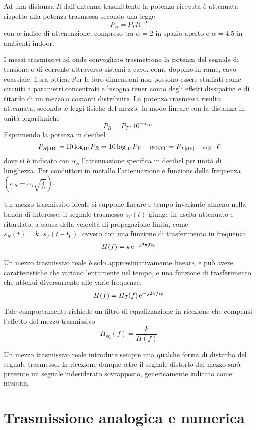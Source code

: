 Ad una distanza $R$ dall'antenna trasmittente la potenza ricevuta è attenuata rispetto alla potenza trasmessa secondo una legge
\begin{equation}
P_R=P_T R^{-\alpha}
\end{equation}
con $\alpha$ indice di attenuazione, compreso tra $\alpha=2$ in spazio aperto e $\alpha=4.5$ in ambienti indoor.

I mezzi trasmissivi ad onde convogliate trasmettono la potenza del segnale di tensione o di corrente attraverso sistemi a cavo, come doppino in rame, cavo coassiale, fibra ottica. Per le loro dimensioni non possono essere studiati come circuiti a parametri concentrati e bisogna tener conto degli effetti dissipativi e di ritardo di un mezzo a costanti distribuite.
La potenza trasmessa risulta attenuata, secondo le leggi fisiche del mezzo, in modo lineare con la distanza in unità logaritmiche
\begin{equation}
P_R=P_T\cdot{10}^{-\alpha_\text{TOT}}
\end{equation}
Esprimendo la potenza in decibel
\[P_{R\text{[dB]}}=10\operatorname{log_{10}} P_R=10\operatorname{log_{10}} P_T-\alpha_\text{TOT}=P_{T\text{[dB]}}-\alpha_S\cdot\ell \]
dove si è indicato con $\alpha_S$ l'attenuazione specifica in decibel per unità di lunghezza. Per conduttori in metallo l'attenuazione è funzione della frequenza $\left(\alpha_S=\alpha_\text{r}\sqrt{\frac{f}{f_r}}\right)$.

Un mezzo trasmissivo ideale si suppone lineare e tempo-invariante almeno nella banda di interesse. Il segnale trasmesso $s_T(t)$ giunge in uscita attenuato e ritardato, a causa della velocità di propagazione finita, come $s_R(t)=k\cdot s_T(t-t_0)$, ovvero con una funzione di trasferimento in frequenza \[H(f)=k\operatorname{e}^{-\operatorname{\mathit{j}\!} 2\pi f t_0}\]

Un mezzo trasmissivo reale è solo approssimativamente lineare, e può avere caratteristiche che variano lentamente nel tempo, e una funzione di trasferimento che attenui diversamente alle varie frequenze, \[H(f)=H_T(f)\operatorname{e}^{-\operatorname{\mathit{j}\!} 2\pi f t_0}\]

Tale comportamento richiede un filtro di equalizzazione in ricezione che compensi l'effetto del mezzo trasmissivo \[H_\text{eq}(f)=\frac{k}{H(f)}\]

Un mezzo trasmissivo reale introduce sempre una qualche forma di disturbo del segnale trasmesso. In ricezione dunque oltre il segnale distorto dal mezzo sarà presente un segnale indesiderato sovrapposto, genericamente indicato come \textsc{rumore}.

\section{Trasmissione analogica e numerica}

